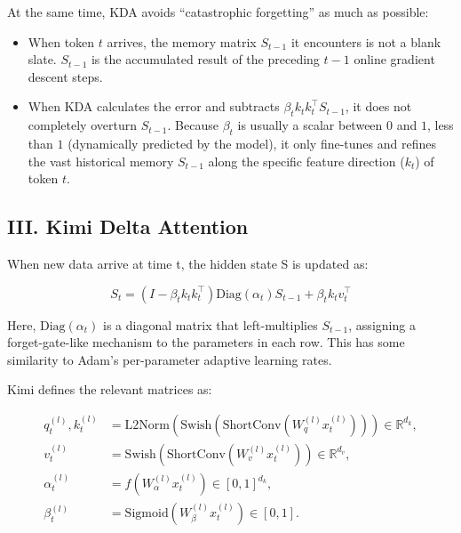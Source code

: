 At the same time, KDA avoids ``catastrophic forgetting'' as much as possible:

\begin{itemize}
\tightlist
\item
  When token \(t\) arrives, the memory matrix \(S_{t-1}\) it encounters is not a blank slate. \(S_{t-1}\) is the accumulated result of the preceding \(t-1\) online gradient descent steps.
\item
  When KDA calculates the error and subtracts \(\beta_t k_t k_t^\top S_{t-1}\), it does not completely overturn \(S_{t-1}\). Because \(\beta_t\) is usually a scalar between \(0\) and \(1\), less than \(1\) (dynamically predicted by the model), it only fine-tunes and refines the vast historical memory \(S_{t-1}\) along the specific feature direction (\(k_t\)) of token \(t\).
\end{itemize}

\hypertarget{iii.-kimi-delta-attention}{%
\subsection{III. Kimi Delta Attention}\label{iii.-kimi-delta-attention}}

When new data arrive at time t, the hidden state S is updated as:

\[
S_t=\left(I-\beta_t k_t k_t^\top\right)\mathrm{Diag}(\alpha_t)S_{t-1}+\beta_t k_t v_t^\top
\]

Here, \(\mathrm{Diag}(\alpha_t)\) is a diagonal matrix that left-multiplies \(S_{t-1}\), assigning a forget-gate-like mechanism to the parameters in each row. This has some similarity to Adam's per-parameter adaptive learning rates.

Kimi defines the relevant matrices as:

\[
\begin{aligned}
q_t^{(l)},k_t^{(l)}
&=\mathrm{L2Norm}\left(\mathrm{Swish}\left(\mathrm{ShortConv}\left(W_q^{(l)}x_t^{(l)}\right)\right)\right)\in\mathbb{R}^{d_k},\\
v_t^{(l)}
&=\mathrm{Swish}\left(\mathrm{ShortConv}\left(W_v^{(l)}x_t^{(l)}\right)\right)\in\mathbb{R}^{d_v},\\
\alpha_t^{(l)}
&=f\left(W_\alpha^{(l)}x_t^{(l)}\right)\in[0,1]^{d_k},\\
\beta_t^{(l)}
&=\mathrm{Sigmoid}\left(W_\beta^{(l)}x_t^{(l)}\right)\in[0,1].
\end{aligned}
\]

